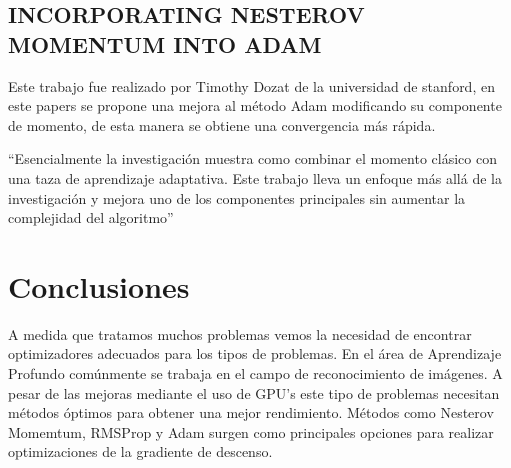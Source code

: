 \subsection{INCORPORATING NESTEROV MOMENTUM INTO ADAM}
Este trabajo fue realizado por Timothy Dozat de la universidad de stanford, en este papers se propone una mejora al método Adam modificando su componente de momento, de esta manera se obtiene una convergencia más rápida.

\textquotedblleft Esencialmente la investigación muestra como combinar el momento clásico con una taza de aprendizaje adaptativa. Este trabajo lleva un enfoque más allá de la investigación y mejora uno de los componentes principales sin aumentar la complejidad del algoritmo\textquotedblright \cite{NMIA}
\section{Conclusiones}
A medida que tratamos muchos problemas vemos la necesidad de encontrar optimizadores adecuados para los tipos de problemas. En el área de Aprendizaje Profundo comúnmente se trabaja en el campo de reconocimiento de imágenes. A pesar de las mejoras mediante el uso de GPU's este tipo de problemas necesitan métodos óptimos para obtener una mejor rendimiento. Métodos como Nesterov Momemtum, RMSProp y Adam surgen como principales opciones para realizar optimizaciones de la gradiente de descenso.


